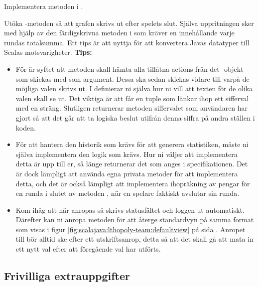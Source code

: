 \Subtask Implementera metoden  i .

\Subtask Utöka -metoden så att grafen skrivs ut efter spelets slut. 
Själva uppritningen sker med hjälp av den färdigskrivna metoden  i  som kräver en  innehållande varje rundas totalsumma. 
Ett tips är att nyttja  för att konvertera Javas datatyper till Scalas motsvarigheter.
\newline
\newline
\textbf{Tips:}

\begin{itemize}
\item  För  är syftet att metoden skall hämta alla tillåtna actions från det -objekt som skickas med som argument. Dessa ska sedan skickas vidare till  varpå de möjliga valen skrivs ut. I  definierar ni själva hur ni vill att texten för de olika valen skall se ut. Det viktiga är att  får en tuple som länkar ihop ett sifferval med en sträng. Slutligen returnerar metoden siffervalet som användaren har gjort så att det går att ta logiska beslut utifrån denna siffra på andra ställen i koden.

\item  För att hantera den historik som krävs för att generera statistiken, måste ni själva implementera den logik som krävs. Hur ni väljer att implementera detta är upp till er, så länge  returnerar det som anges i specifikationen. Det är dock lämpligt att använda egna privata metoder för att implementera detta, och det är också lämpligt att implementera ihopräkning av pengar för en runda i slutet av metoden , när en spelare faktiskt avslutar sin runda.
\item Kom ihåg att när  anropas så skrivs statusfältet och loggen ut automatiskt. Därefter kan ni anropa metoden  för att återge standardvyn på samma format som visas i figur \ref{fig:scalajava:lthopoly-team:defaultview} på sida \pageref{fig:scalajava:lthopoly-team:defaultview}.
Anropet till  bör alltid ske efter ett utskriftsanrop, detta så att det skall gå att mata in ett nytt val efter att föregående val har utförts.

\end{itemize}

\subsection{Frivilliga extrauppgifter}


